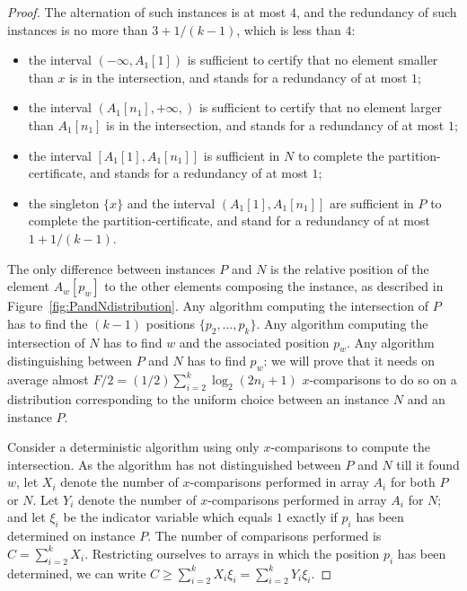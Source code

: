 \begin{proof}
The alternation of such instances is at most $4$, and the redundancy
of such instances is no more than $3+{1/(k{-}1)}$, which is less
than $4$:
%
\begin{itemize}
\item the interval $\left(-\infty,A_{1}[1]\right)$ is sufficient to
  certify that no element smaller than $x$ is in the intersection, and
  stands for a redundancy of at most $1$;
%
\item the interval $\left(A_{1}[n_1],+\infty,\right)$ is sufficient to
  certify that no element larger than $A_{1}[n_1]$ is in the
  intersection, and stands for a redundancy of at most $1$;
%
\item  the interval $\left[A_1[1],A_{1}[n_{1}]\right]$ is sufficient in $N$
to complete the partition-certificate, and stands for a redundancy of
at most $1$;
% 
\item  the singleton $\{x\}$ and the interval
$\left(A_1[1],A_{1}[n_{1}]\right]$ are sufficient in $P$ to complete
the partition-certificate, and stand for a redundancy of at most
$1{+}{1/(k-1)}$.
\end{itemize}

The only difference between instances $P$ and $N$ is the relative
position of the element $A_{w}[p_{w}]$ to the other elements composing
the instance, as described in Figure~\ref{fig:PandNdistribution}.
%
Any algorithm computing the intersection of $P$ has to find the
$(k-1)$ positions $\{p_2,\ldots,p_k\}$.
%
Any algorithm computing the intersection of $N$ has to find $w$ and
the
associated
position $p_w$.
%
Any algorithm distinguishing between $P$ and $N$ has to find $p_w$:
%
we will prove that it needs on average almost
${F/2}={(1/2)}\sum_{i=2}^k\log_2(2n_i+1)$ $x$-comparisons to do so on
a distribution corresponding to the uniform choice between an instance
$N$ and an instance $P$.

Consider a deterministic algorithm using
only $x$-comparisons to compute the intersection.
%
As the algorithm  has not distinguished between $P$ and $N$ till it
found $w$, let $X_i$ denote the number of $x$-comparisons performed
 in array $A_i$ for both $P$ or $N$.
%
Let $Y_i$ denote the number of $x$-comparisons performed  in
array $A_i$ for $N$;
%
and let $\xi_i$ be the indicator variable which equals $1$ exactly if
$p_i$ has been determined  on instance $P$.
%
The number of comparisons performed  is $C=\sum_{i=2}^k X_i$.
Restricting ourselves to arrays in which the position $p_i$ has been
determined, we can write $C\geq\sum_{i=2}^k X_i\xi_i
=\sum_{i=2}^k Y_i\xi_i$.


\end{proof}
